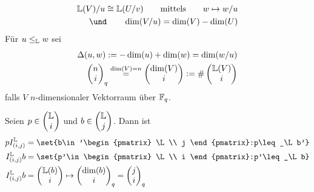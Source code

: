 \begin{satz}
	\begin{align*}
		\L(V)/u\cong\L(U/v)
		\qquad\text{mittels}\qquad
		w\mapsto w/u\\
		\und\qquad
		\dim(V/u)=\dim(V)-\dim(U)
	\end{align*}
	Für $u\leq_{\mathbb{L}} w$ sei 
	\begin{align*}
		\Delta(u,w):=-\dim(u)+\dim(w)=\dim(w/u)\\
		\begin{pmatrix}
			n\\
			i
		\end{pmatrix}_q\overset{\dim(V)=n}{=}
		\begin{pmatrix}
			\dim(V)\\
			i
		\end{pmatrix}:=
		\#\begin{pmatrix}
			\mathbb{L}(V)\\
			i
		\end{pmatrix}
	\end{align*}
	falls $V$ $n$-dimensionaler Vektorraum über $\mathbb{F}_q$.
\end{satz}

\begin{figure}[H]
	\begin{center}
			
		\end{center}
\end{figure}

Seien $p\in\begin{pmatrix}
	\mathbb{L}\\
	i
\end{pmatrix}$ und $b\in\begin{pmatrix}
	\mathbb{L}\\
	j
\end{pmatrix}$.
Dann ist
\begin{align*}
	p I_{(i,j)}^\L&=\set{b\in'\begin{pmatrix}
		\L\\
		j
	\end{pmatrix}:p\leq_\L b'}\\
	I_{(i,j)}^\L b&=\set{p'\in\begin{pmatrix}
		\L\\
		i
	\end{pmatrix}:p'\leq_\L b}\\
	I_{(i,j)}^\L b&=\begin{pmatrix}
		\L(b)\\
		i
	\end{pmatrix}\mapsto
	\begin{pmatrix}
		\dim(b)\\
		i
	\end{pmatrix}_q=\begin{pmatrix}
		j\\
		i
	\end{pmatrix}_q
\end{align*}

